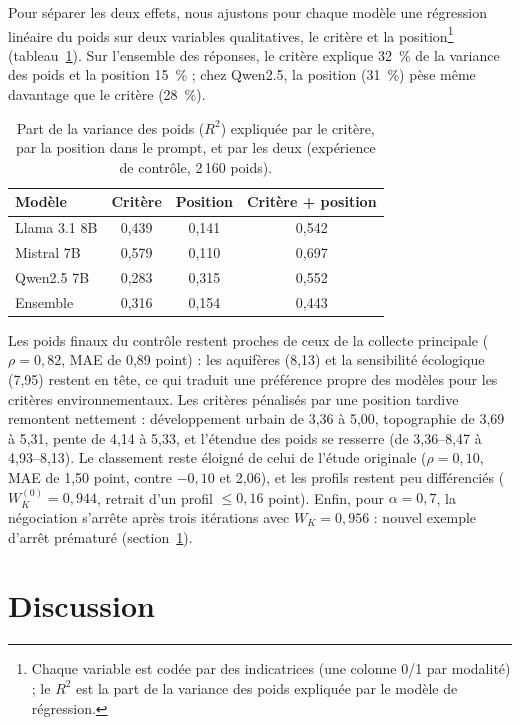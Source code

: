 \documentclass[11pt,a4paper]{article}
\begin{document}
Pour séparer les deux effets, nous ajustons pour chaque modèle une régression linéaire du poids sur deux variables qualitatives, le critère et la position\footnote{Chaque variable est codée par des indicatrices (une colonne 0/1 par modalité) ; le $R^2$ est la part de la variance des poids expliquée par le modèle de régression.} (tableau~\ref{tab:decomp}). Sur l'ensemble des réponses, le critère explique 32~\% de la variance des poids et la position 15~\% ; chez Qwen2.5, la position (31~\%) pèse même davantage que le critère (28~\%).

\begin{table}[htbp]
\centering
\caption{Part de la variance des poids ($R^2$) expliquée par le critère, par la position dans le prompt, et par les deux (expérience de contrôle, 2\,160 poids).}
\label{tab:decomp}
\small
\begin{tabular}{@{}lccc@{}}
\toprule
Modèle & Critère & Position & Critère + position \\
\midrule
Llama 3.1 8B & 0,439 & 0,141 & 0,542 \\
Mistral 7B & 0,579 & 0,110 & 0,697 \\
Qwen2.5 7B & 0,283 & 0,315 & 0,552 \\
Ensemble & 0,316 & 0,154 & 0,443 \\
\bottomrule
\end{tabular}
\end{table}

Les poids finaux du contrôle restent proches de ceux de la collecte principale ($\rho=0{,}82$, MAE de 0,89 point) : les aquifères (8,13) et la sensibilité écologique (7,95) restent en tête, ce qui traduit une préférence propre des modèles pour les critères environnementaux. Les critères pénalisés par une position tardive remontent nettement : développement urbain de 3,36 à 5,00, topographie de 3,69 à 5,31, pente de 4,14 à 5,33, et l'étendue des poids se resserre (de 3,36--8,47 à 4,93--8,13). Le classement reste éloigné de celui de l'étude originale ($\rho=0{,}10$, MAE de 1,50 point, contre $-0{,}10$ et 2,06), et les profils restent peu différenciés ($W_K^{(0)}=0{,}944$, retrait d'un profil $\le0{,}16$ point). Enfin, pour $\alpha=0{,}7$, la négociation s'arrête après trois itérations avec $W_K=0{,}956$ : nouvel exemple d'arrêt prématuré (section~\ref{sec:discussion}).

\section{Discussion}\label{sec:discussion}
\end{document}
